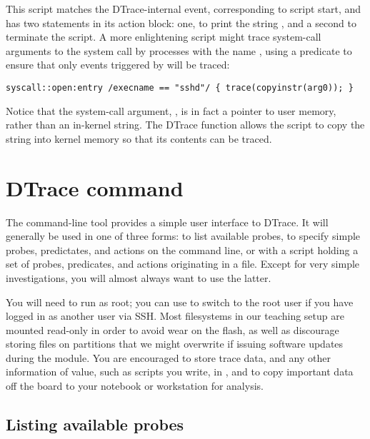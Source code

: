 \documentclass[a4paper,10pt]{article}
\begin{document}
This script matches the DTrace-internal  event, corresponding to
script start, and has two statements in its action block: one, to print the
string , and a second to terminate the script.
A more enlightening script might trace system-call arguments to the
 system call by processes with the name , using a
predicate to ensure that only events triggered by  will be traced:

\begin{small}
\begin{verbatim}
syscall::open:entry /execname == "sshd"/ { trace(copyinstr(arg0)); }
\end{verbatim}
\end{small}

\noindent
Notice that the system-call argument, , is in fact a pointer to
user memory, rather than an in-kernel string.
The DTrace  function allows the script to copy the string
into kernel memory so that its contents can be traced.

\section*{DTrace command}

The  command-line tool provides a simple user interface to
DTrace.
It will generally be used in one of three forms: to list available probes, to
specify simple probes, predictates, and actions on the command line, or with a
script holding a set of probes, predicates, and actions originating in a file.
Except for very simple investigations, you will almost always want to use the
latter.

You will need to run  as root; you can use  to
switch to the root user if you have logged in as another user via SSH.
Most filesystems in our teaching setup are mounted read-only in order to avoid
wear on the flash, as well as discourage storing files on partitions that we
might overwrite if issuing software updates during the module.
You are encouraged to store trace data, and any other information of value,
such as scripts you write, in , and to copy important data off
the board to your notebook or workstation for analysis.

\subsection*{Listing available probes}
\end{document}

